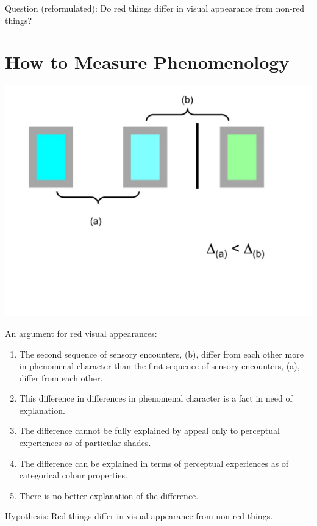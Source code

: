 \documentclass[12pt]{extarticle}
\begin{document}
\begin{multicols*}{3}
Question (reformulated):
Do red things differ in visual appearance from non-red things?




\section{How to Measure Phenomenology}

\begin{center}
\includegraphics[scale=0.25]{img/categorical_colour_difference3.jpg}
\end{center}

An argument for red visual appearances:
\begin{enumerate}
  \item The second sequence of sensory encounters, (b), differ from each other more in phenomenal character than the first sequence of sensory encounters, (a), differ from each other.
  \item This difference in differences in phenomenal character is a fact in need of explanation.
  \item The difference cannot be fully explained by appeal only to perceptual experiences as of particular shades.
  \item The difference can be explained in terms of perceptual experiences as of categorical colour properties.
  \item There is no better explanation of the difference.
\end{enumerate}
  

Hypothesis: Red things differ in visual appearance from non-red things.


\end{multicols*}
\end{document}
